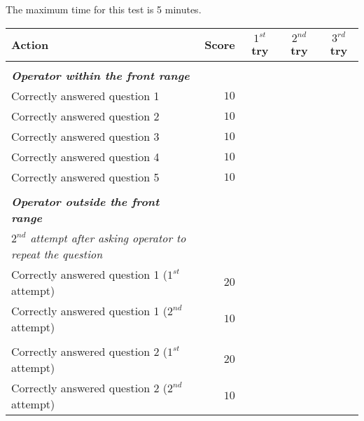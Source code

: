 The maximum time for this test is 5 minutes.





\begin{tabularx}{\textwidth}{X r c c c }

	\textbf{Action} & \textbf{Score} & \textbf{$1^{st}$ try} & \textbf{$2^{nd}$ try} & \textbf{$3^{rd}$ try} \\ \hline
	& & & & \\ 
	\textit{\textbf{Operator within the \textit{front range}}} \\
	Correctly answered question 1 & $10$ & \hrulefill & \hrulefill & \hrulefill \\
	Correctly answered question 2 & $10$ & \hrulefill & \hrulefill & \hrulefill \\
	Correctly answered question 3 & $10$ & \hrulefill & \hrulefill & \hrulefill \\
	Correctly answered question 4 & $10$ & \hrulefill & \hrulefill & \hrulefill \\
	Correctly answered question 5 & $10$ & \hrulefill & \hrulefill & \hrulefill \\
	& & & & \\ 
	\textit{\textbf{Operator outside the \textit{front range}}} \\
	\textit{\footnotesize $2^{nd}$ attempt after asking operator to repeat the question} \\
	Correctly answered question 1 ($1^{st}$ attempt) & $20$ & \hrulefill & \hrulefill & \hrulefill \\
	Correctly answered question 1 ($2^{nd}$ attempt) & $10$ & \hrulefill & \hrulefill & \hrulefill \\
	& & & & \\ 
	Correctly answered question 2 ($1^{st}$ attempt) & $20$ & \hrulefill & \hrulefill & \hrulefill \\
	Correctly answered question 2 ($2^{nd}$ attempt) & $10$ & \hrulefill & \hrulefill & \hrulefill \\

\end{tabularx}
